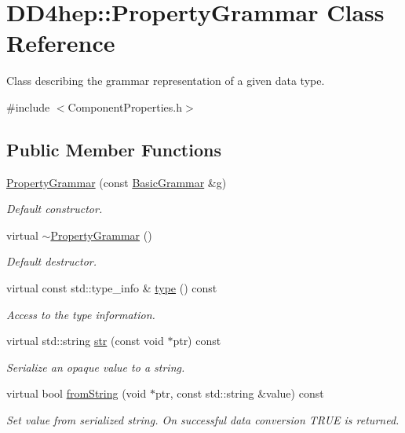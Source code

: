 \hypertarget{class_d_d4hep_1_1_property_grammar}{}\section{D\+D4hep\+:\+:Property\+Grammar Class Reference}
\label{class_d_d4hep_1_1_property_grammar}


Class describing the grammar representation of a given data type.  




{\ttfamily \#include $<$Component\+Properties.\+h$>$}

\subsection*{Public Member Functions}
\begin{DoxyCompactItemize}
\item 
\hyperlink{class_d_d4hep_1_1_property_grammar_a667cf30a8e7df73005e88e30871716c8}{Property\+Grammar} (const \hyperlink{class_d_d4hep_1_1_basic_grammar}{Basic\+Grammar} \&g)
\begin{DoxyCompactList}\small\item\em Default constructor. \end{DoxyCompactList}\item 
virtual \hyperlink{class_d_d4hep_1_1_property_grammar_a5de8cc9e35a539f8ad254950e6f1f6dc}{$\sim$\+Property\+Grammar} ()
\begin{DoxyCompactList}\small\item\em Default destructor. \end{DoxyCompactList}\item 
virtual const std\+::type\+\_\+info \& \hyperlink{class_d_d4hep_1_1_property_grammar_aea4c24c398e36de2b67b65f8083a62a8}{type} () const
\begin{DoxyCompactList}\small\item\em Access to the type information. \end{DoxyCompactList}\item 
virtual std\+::string \hyperlink{class_d_d4hep_1_1_property_grammar_a5546977c21fc7cb70df7fb510f8951c3}{str} (const void $\ast$ptr) const
\begin{DoxyCompactList}\small\item\em Serialize an opaque value to a string. \end{DoxyCompactList}\item 
virtual bool \hyperlink{class_d_d4hep_1_1_property_grammar_ac0c3cd97e12d8bbbff7618fea05cbc60}{from\+String} (void $\ast$ptr, const std\+::string \&value) const
\begin{DoxyCompactList}\small\item\em Set value from serialized string. On successful data conversion T\+R\+UE is returned. \end{DoxyCompactList}\end{DoxyCompactItemize}

